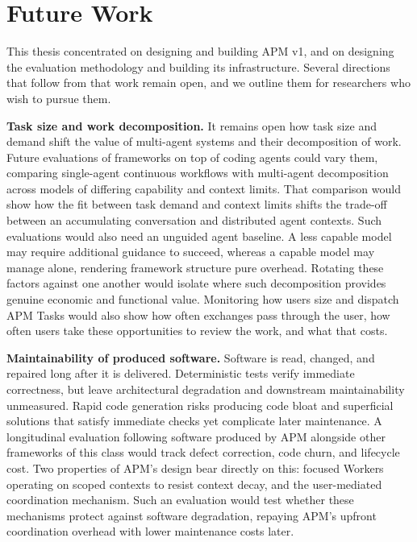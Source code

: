 \section{Future Work}
\label{sec:conclusion-future-work}

This thesis concentrated on designing and building APM v1, and on designing the evaluation methodology and building its infrastructure. Several directions that follow from that work remain open, and we outline them for researchers who wish to pursue them.

\textbf{Task size and work decomposition.} It remains open how task size and demand shift the value of multi-agent systems and their decomposition of work. Future evaluations of frameworks on top of coding agents could vary them, comparing single-agent continuous workflows with multi-agent decomposition across models of differing capability and context limits. That comparison would show how the fit between task demand and context limits shifts the trade-off between an accumulating conversation and distributed agent contexts. Such evaluations would also need an unguided agent baseline. A less capable model may require additional guidance to succeed, whereas a capable model may manage alone, rendering framework structure pure overhead. Rotating these factors against one another would isolate where such decomposition provides genuine economic and functional value. Monitoring how users size and dispatch APM Tasks would also show how often exchanges pass through the user, how often users take these opportunities to review the work, and what that costs.

\textbf{Maintainability of produced software.} Software is read, changed, and repaired long after it is delivered. Deterministic tests verify immediate correctness, but leave architectural degradation and downstream maintainability unmeasured. Rapid code generation risks producing code bloat and superficial solutions that satisfy immediate checks yet complicate later maintenance. A longitudinal evaluation following software produced by APM alongside other frameworks of this class would track defect correction, code churn, and lifecycle cost. Two properties of APM's design bear directly on this: focused Workers operating on scoped contexts to resist context decay, and the user-mediated coordination mechanism. Such an evaluation would test whether these mechanisms protect against software degradation, repaying APM's upfront coordination overhead with lower maintenance costs later.

